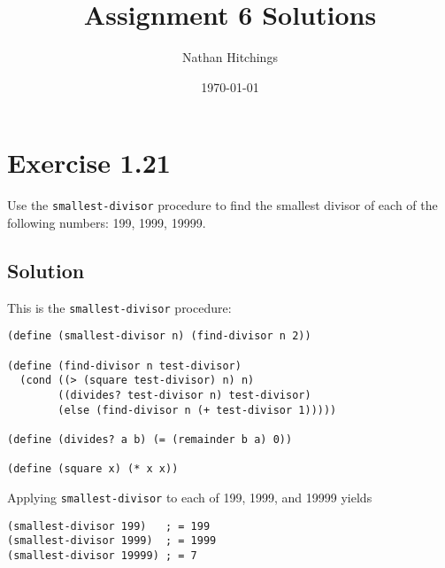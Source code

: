 \documentclass[11pt]{article}
\author{Nathan Hitchings}
\date{\today}
\title{Assignment 6 Solutions}
\begin{document}
\maketitle
\section{Exercise 1.21}
\label{sec:orgf37bba4}
Use the \texttt{smallest-divisor} procedure to find the smallest divisor of each of
the following numbers: 199, 1999, 19999.
\subsection{Solution}
\label{sec:org9537dc4}
This is the \texttt{smallest-divisor} procedure:
\begin{verbatim}
(define (smallest-divisor n) (find-divisor n 2))

(define (find-divisor n test-divisor)
  (cond ((> (square test-divisor) n) n)
        ((divides? test-divisor n) test-divisor)
        (else (find-divisor n (+ test-divisor 1)))))

(define (divides? a b) (= (remainder b a) 0))

(define (square x) (* x x))
\end{verbatim}
Applying \texttt{smallest-divisor} to each of 199, 1999, and 19999 yields
\begin{verbatim}
(smallest-divisor 199)   ; = 199
(smallest-divisor 1999)  ; = 1999
(smallest-divisor 19999) ; = 7
\end{verbatim}
\end{document}
